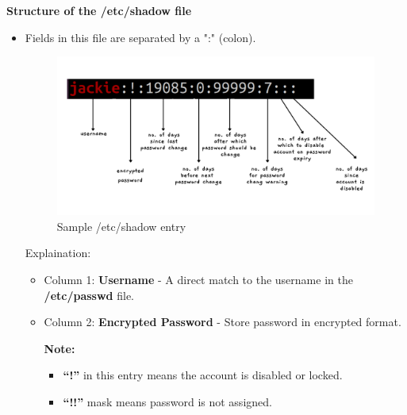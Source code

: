\begin{flushleft}
\textbf{Structure of the /etc/shadow file}
\begin{itemize}
	\item Fields in this file are separated by a ":" (colon).
	\begin{figure}[h!]
		\centering
		\includegraphics[scale=.2]{content/chapter4/images/55.png}
		\caption{Sample /etc/shadow entry}
		\label{fig:user_group}
	\end{figure}	
	\newline
	Explaination:
	\begin{itemize}
		\item Column 1: \textbf{Username} - A direct match to the username in the \textbf{/etc/passwd} file.
		\item Column 2: \textbf{Encrypted Password} - Store password in encrypted format.
		\bigskip
		\begin{tcolorbox}[breakable,notitle,boxrule=-0pt,colback=yellow,colframe=yellow]
			\color{black}
			\textbf{Note:} 
			\begin{itemize}
				\item \textbf{“!”} in this entry means the account is disabled or locked. 
				\item \textbf{“!!”} mask means password is not assigned.
			\end{itemize}
		\end{tcolorbox}
		
		
		

\end{itemize}
\end{itemize}
\end{flushleft}
